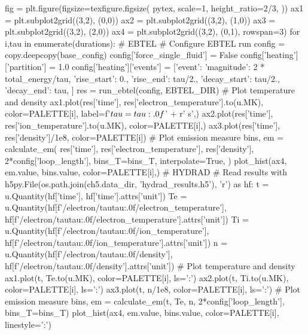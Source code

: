 \begin{pycode}[chapter5]
fig = plt.figure(figsize=texfigure.figsize(
    pytex,
    scale=1,
    height_ratio=2/3,
))
ax1 = plt.subplot2grid((3,2), (0,0))
ax2 = plt.subplot2grid((3,2), (1,0))
ax3 = plt.subplot2grid((3,2), (2,0))
ax4 = plt.subplot2grid((3,2), (0,1), rowspan=3)
for i,tau in enumerate(durations):
    # EBTEL
    # Configure EBTEL run
    config = copy.deepcopy(base_config)
    config['force_single_fluid'] = False
    config['heating']['partition'] = 1.0
    config['heating']['events'] = [{'event': {
        'magnitude': 2 * total_energy/tau,
        'rise_start': 0.,
        'rise_end': tau/2.,
        'decay_start': tau/2.,
        'decay_end': tau,
    }}]
    res = run_ebtel(config, EBTEL_DIR)
    # Plot temperature and density
    ax1.plot(res['time'], res['electron_temperature'].to(u.MK), color=PALETTE[i],
             label=f'$\\tau={tau:.0f}$' + r' \si{\second}',)
    ax2.plot(res['time'], res['ion_temperature'].to(u.MK), color=PALETTE[i],)
    ax3.plot(res['time'], res['density']/1e8, color=PALETTE[i])
    # Plot emission measure
    bins, em = calculate_em(
        res['time'],
        res['electron_temperature'],
        res['density'],
        2*config['loop_length'],
        bins_T=bins_T,
        interpolate=True,
    )
    plot_hist(ax4, em.value, bins.value, color=PALETTE[i],)
    # HYDRAD
    # Read results
    with h5py.File(os.path.join(ch5.data_dir, 'hydrad_results.h5'), 'r') as hf:
        t = u.Quantity(hf['time'], hf['time'].attrs['unit'])
        Te = u.Quantity(hf[f'/electron/tau{tau:.0f}/electron_temperature'],
                        hf[f'/electron/tau{tau:.0f}/electron_temperature'].attrs['unit'])
        Ti = u.Quantity(hf[f'/electron/tau{tau:.0f}/ion_temperature'],
                        hf[f'/electron/tau{tau:.0f}/ion_temperature'].attrs['unit'])
        n = u.Quantity(hf[f'/electron/tau{tau:.0f}/density'],
                       hf[f'/electron/tau{tau:.0f}/density'].attrs['unit'])
    # Plot temperature and density
    ax1.plot(t, Te.to(u.MK), color=PALETTE[i], ls=':')
    ax2.plot(t, Ti.to(u.MK), color=PALETTE[i], ls=':')
    ax3.plot(t, n/1e8, color=PALETTE[i], ls=':')
    # Plot emission measure
    bins, em = calculate_em(t, Te, n, 2*config['loop_length'], bins_T=bins_T)
    plot_hist(ax4, em.value, bins.value, color=PALETTE[i], linestyle=':')
    

\end{pycode}
